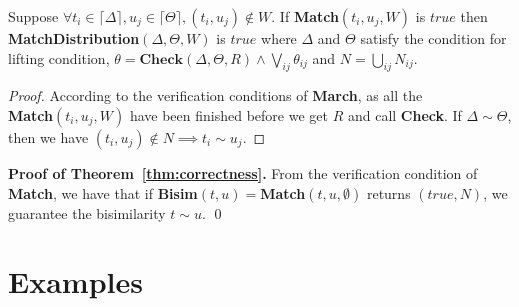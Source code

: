 \documentclass[a4paper,UKenglish,cleveref, autoref]{lipics-v2019}
\begin{document}
\begin{proposition}
	Suppose $\forall t_i\in\lceil\Delta\rceil,u_j\in\lceil\Theta\rceil , (t_i,u_j)\notin W$.
	If \textbf{Match}$(t_i,u_j,W)$ is $true$ then \textbf{MatchDistribution}$(\Delta,\Theta,W)$ is $true$ where $\Delta$ and $\Theta$ satisfy the condition for lifting condition, $\theta=\textbf{Check}(\Delta,\Theta,\textit{R})\wedge\bigvee_{ij}\theta_{ij}$  and $N=\bigcup_{ij}N_{ij}$.
\end{proposition}
\begin{proof}
	According to the verification conditions of \textbf{March}, as all the \\\textbf{Match}$(t_i,u_j,W)$ have been finished before we get $R$ and call \textbf{Check}. If $\Delta\sim \Theta$, then we have $(t_i,u_j)\notin N\implies t_i\sim u_j$.
\end{proof}

\noindent\textbf{Proof of Theorem~\ref{thm:correctness}.} 
From the verification condition of \textbf{Match}, we have that if \textbf{Bisim}$(t,u)=$\textbf{Match}$(t,u,\emptyset)$ returns $(true, N)$, we guarantee the bisimilarity $t\sim u$.
\hfill\qed

\section{Examples}
\label{sec:examples}
\end{document}
